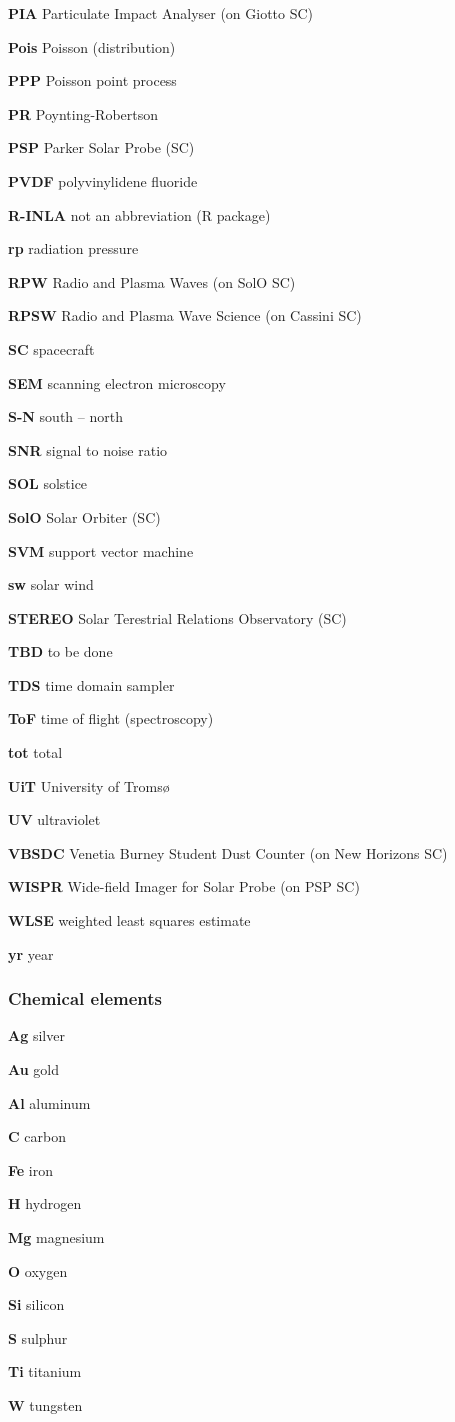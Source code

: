 \textbf{PIA} Particulate Impact Analyser (on Giotto SC)

\textbf{Pois} Poisson (distribution)

\textbf{PPP} Poisson point process

\textbf{PR} Poynting-Robertson

\textbf{PSP} Parker Solar Probe (SC)

\textbf{PVDF} polyvinylidene fluoride

\textbf{R-INLA} not an abbreviation (R package)

\textbf{rp} radiation pressure

\textbf{RPW} Radio and Plasma Waves (on SolO SC)

\textbf{RPSW} Radio and Plasma Wave Science (on Cassini SC)

\textbf{SC} spacecraft

\textbf{SEM} scanning electron microscopy

\textbf{S-N} south -- north

\textbf{SNR} signal to noise ratio

\textbf{SOL} solstice

\textbf{SolO} Solar Orbiter (SC)

\textbf{SVM} support vector machine

\textbf{sw} solar wind

\textbf{STEREO} Solar Terestrial Relations Observatory (SC)

\textbf{TBD} to be done

\textbf{TDS} time domain sampler

\textbf{ToF} time of flight (spectroscopy)

\textbf{tot} total

\textbf{UiT} University of Troms{\o}

\textbf{UV} ultraviolet

\textbf{VBSDC} Venetia Burney Student Dust Counter (on New Horizons SC)

\textbf{WISPR} Wide-field Imager for Solar Probe (on PSP SC)

\textbf{WLSE} weighted least squares estimate

\textbf{yr} year


\subsubsection{Chemical elements}

\noindent

\textbf{Ag} silver

\textbf{Au} gold

\textbf{Al} aluminum

\textbf{C} carbon

\textbf{Fe} iron

\textbf{H} hydrogen 

\textbf{Mg} magnesium

\textbf{O} oxygen

\textbf{Si} silicon

\textbf{S} sulphur

\textbf{Ti} titanium

\textbf{W} tungsten